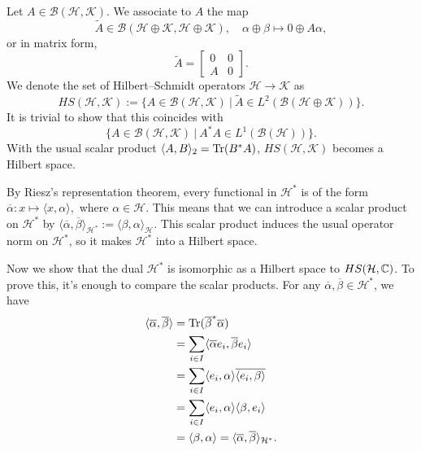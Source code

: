 Let $A \in \mathcal{B} (\mathcal{H}, \mathcal{K})$.
We associate to $A$ the map 
$$\widetilde{A} \in \mathcal{B} (\mathcal{H} \oplus \mathcal{K}, \mathcal{H} \oplus \mathcal{K}),\quad \alpha \oplus \beta \mapsto 0 \oplus A \alpha,$$
or in matrix form,
$$\widetilde{A} = \begin{bmatrix}
  0 & 0\\
  A & 0
\end{bmatrix}.$$
We denote the set of Hilbert--Schmidt operators $\mathcal{H} \to \mathcal{K}$ as 
$$HS (\mathcal{H}, \mathcal{K}) := \{A \in \mathcal{B} (\mathcal{H}, \mathcal{K})\ |\ \widetilde{A} \in L^2 (\mathcal{B}(\mathcal{H} \oplus \mathcal{K}))\}.$$ 
It is trivial to show that this coincides with 
$$\{A \in \mathcal{B} (\mathcal{H}, \mathcal{K})\ |\ A^* A \in L^1 (\mathcal{B}(\mathcal{H}))\}.$$
With the usual scalar product $\langle A, B \rangle_{2} = \operatorname{Tr}(B^* A)$, $HS (\mathcal{H}, \mathcal{K})$ becomes a Hilbert space.

\begin{example}
  By Riesz's representation theorem, every functional in $\mathcal{H}^*$
  is of the form $\overline{\alpha}: x \mapsto \langle x, \alpha \rangle,$
  where $\alpha \in \mathcal{H}$. 
  This means that we can introduce a scalar product on $\mathcal{H}^*$ by 
  $\langle \overline{\alpha}, \overline{\beta} \rangle_{\mathcal{H}^*} := \langle \beta, \alpha \rangle_{\mathcal{H}}.$
  This scalar product induces the usual operator norm on $\mathcal{H}^*$, so it makes $\mathcal{H}^*$
  into a Hilbert space. 
\end{example}  

\begin{example}
  Now we show that the dual $\mathcal{H}^*$ is isomorphic as a Hilbert space to $HS(\mathcal{H}, \mathbb {C})$. To prove this, it's enough to compare the scalar products.
  For any $\overline{\alpha}, \overline{\beta} \in \mathcal{H}^*$, we have 
  \begin{align*}
    \langle \overline{\alpha}, \overline{\beta} \rangle &= \operatorname{Tr} (\overline{\beta}^* \overline{\alpha})\\
    &= \sum_{i \in I} \langle \overline{\alpha} e_i, \overline{\beta} e_i\rangle\\
    &= \sum_{i \in I} \langle e_i, \alpha \rangle \overline{\langle e_i, \beta \rangle}\\
    &= \sum_{i \in I} \langle e_i, \alpha \rangle {\langle \beta, e_i \rangle}\\
    &= \langle \beta, \alpha\rangle = \langle \overline{\alpha}, \overline{\beta} \rangle_{\mathcal{H}^*}.
  \end{align*}
\end{example}

